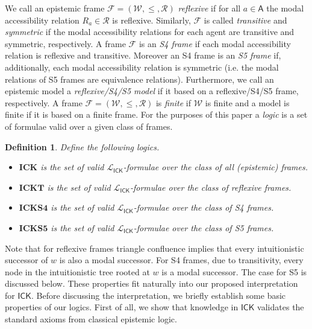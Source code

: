 \documentclass{myifcolog}
\newcommand\A{\mathsf{A}}
\newcommand{\agi}{a}
\newcommand{\ICK}{\mathsf{ICK}}
\newcommand{\LICK}{\mathcal{L}_{\ICK}}
\newcommand{\W}{\mathcal{W}}
\newcommand{\rel}{\mathcal{R}}
\newcommand{\Fr}{\mathcal{F}}
\newtheorem{definition}[theorem]{Definition}
\numberwithin{theorem}{section}
\begin{document}
We call an epistemic frame $\Fr=(\W, \leq, \rel)$ \emph{reflexive} if for all $\agi \in \A$ the modal accessibility relation $R_\agi \in \rel$ is reflexive. Similarly, $\Fr$ is called \emph{transitive} and \emph{symmetric} if the modal accessibility relations for each agent are transitive and symmetric, respectively. A frame $\Fr$ is an \emph{S4 frame} if each modal accessibility relation is reflexive and transitive. Moreover an S4 frame is an \emph{S5 frame} if, additionally, each modal accessibility relation is symmetric (i.e. the modal relations of S5 frames are equivalence relations). Furthermore, we call an epistemic model a \emph{reflexive/S4/S5 model} if it based on a reflexive/S4/S5 frame, respectively. A frame $\Fr=(\W, \leq, \rel)$ is \emph{finite} if $\W$ is finite and a model is finite if it is based on a finite frame. For the purposes of this paper a \emph{logic} is a set of formulae valid over a given class of frames.

\begin{definition}
    Define the following logics.
    \begin{itemize}
        \item  $\mathbf{ICK}$ is the set of valid $\LICK$-formulae over the class of all (epistemic) frames.
        \item $\mathbf{ICKT}$ is the set of valid $\LICK$-formulae over the class of reflexive frames.
        \item $\mathbf{ICKS4}$ is the set of valid $\LICK$-formulae over the class of S4 frames.
        \item $\mathbf{ICKS5}$ is the set of valid $\LICK$-formulae over the class of S5 frames.
    \end{itemize}
\end{definition}

Note that for reflexive frames triangle confluence implies that every intuitionistic successor of $w$ is also a modal successor. For S4 frames, due to transitivity, every node in the intuitionistic tree rooted at $w$ is a modal successor. The case for S5 is discussed below. These properties fit naturally into our proposed interpretation for $\ICK$. Before discussing the interpretation, we briefly establish some basic properties of our logics. First of all, we show that knowledge in $\ICK$ validates the standard axioms from classical epistemic logic.
\end{document}
